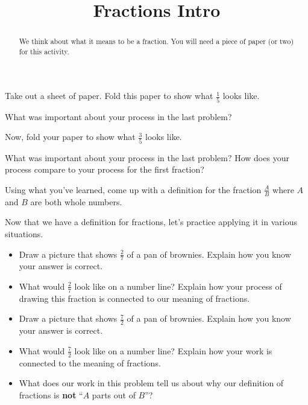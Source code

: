 \documentclass{ximera}
\title{Fractions Intro}
\begin{document}
\begin{abstract} We think about what it means to be a fraction. You will need a piece of paper (or two) for this activity. \end{abstract}
\maketitle


\begin{problem}
Take out a sheet of paper. Fold this paper to show what $\frac{1}{5}$ looks like.
\end{problem}


\begin{problem}
What was important about your process in the last problem?
\end{problem}


\begin{problem}
Now, fold your paper to show what $\frac{3}{5}$ looks like.
\end{problem}


\begin{problem}
What was important about your process in the last problem? How does your process compare to your process for the first fraction?
\end{problem}


\begin{problem}
Using what you've learned, come up with a definition for the fraction $\frac{A}{B}$ where $A$ and $B$ are both whole numbers.
\end{problem}

\newpage

Now that we have a definition for fractions, let's practice applying it in various situations. 

\begin{problem}
\begin{itemize}
	\item Draw a picture that shows $\frac{2}{7}$ of a pan of brownies. Explain how you know your answer is correct.
	\item What would $\frac{2}{7}$ look like on a number line? Explain how your process of drawing this fraction is connected to our meaning of fractions.
	\item Draw a picture that shows $\frac{7}{2}$ of a pan of brownies. Explain how you know your answer is correct.
	\item What would $\frac{7}{2}$ look like on a number line? Explain how your work is connected to the meaning of fractions. 
	\item What does our work in this problem tell us about why our definition of fractions is {\bf not} ``$A$ parts out of $B$''?
\end{itemize}
\end{problem}
\end{document}
